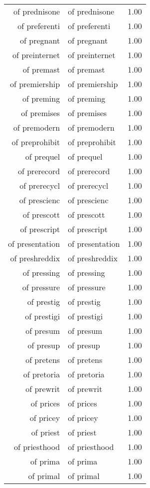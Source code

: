 \begin{table}[ht]
\begin{tabular}{rlr}
  of prednisone & of prednisone & 1.00 \\ 
  of preferenti & of preferenti & 1.00 \\ 
  of pregnant & of pregnant & 1.00 \\ 
  of preinternet & of preinternet & 1.00 \\ 
  of premast & of premast & 1.00 \\ 
  of premiership & of premiership & 1.00 \\ 
  of preming & of preming & 1.00 \\ 
  of premises & of premises & 1.00 \\ 
  of premodern & of premodern & 1.00 \\ 
  of preprohibit & of preprohibit & 1.00 \\ 
  of prequel & of prequel & 1.00 \\ 
  of prerecord & of prerecord & 1.00 \\ 
  of prerecycl & of prerecycl & 1.00 \\ 
  of prescienc & of prescienc & 1.00 \\ 
  of prescott & of prescott & 1.00 \\ 
  of prescript & of prescript & 1.00 \\ 
  of presentation & of presentation & 1.00 \\ 
  of preshreddix & of preshreddix & 1.00 \\ 
  of pressing & of pressing & 1.00 \\ 
  of pressure & of pressure & 1.00 \\ 
  of prestig & of prestig & 1.00 \\ 
  of prestigi & of prestigi & 1.00 \\ 
  of presum & of presum & 1.00 \\ 
  of presup & of presup & 1.00 \\ 
  of pretens & of pretens & 1.00 \\ 
  of pretoria & of pretoria & 1.00 \\ 
  of prewrit & of prewrit & 1.00 \\ 
  of prices & of prices & 1.00 \\ 
  of pricey & of pricey & 1.00 \\ 
  of priest & of priest & 1.00 \\ 
  of priesthood & of priesthood & 1.00 \\ 
  of prima & of prima & 1.00 \\ 
  of primal & of primal & 1.00 \\ 

\end{tabular}
\end{table}
